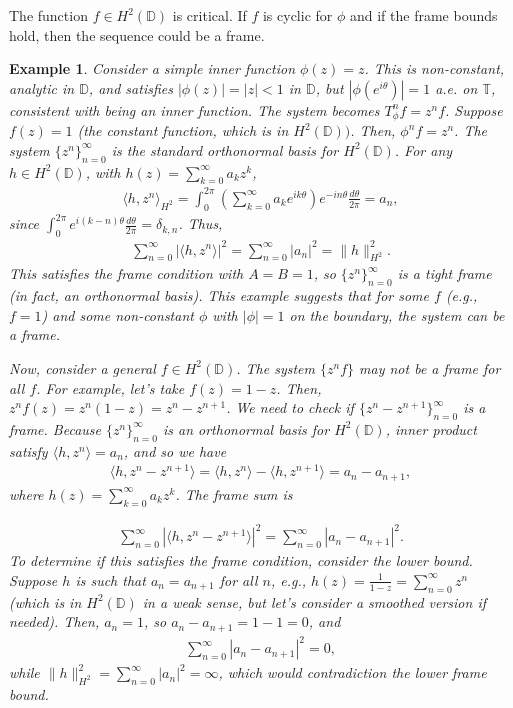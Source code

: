 \documentclass[12pt,titlepage]{amsart}
\newtheorem{exam}[thm]{Example}
\theoremstyle{definition}
\theoremstyle{remark}
\begin{document}
The function $f \in H^2(\mathbb{D})$ is critical. If $f$ is cyclic
for $\phi$ and if the frame bounds hold, then the sequence could
be a frame.
\begin{exam}\label{example.3-1}
Consider a simple inner function $\phi(z)=z$. This is
non-constant, analytic in $\mathbb{D}$, and satisfies
$|\phi(z)|=|z|<1$ in $\mathbb{D}$, but $|\phi(e^{i\theta})|= 1$
a.e. on $\mathbb{T}$, consistent with being an inner function. The
system becomes $T_\phi^n f = z^n f$. Suppose $f(z)=1$ (the
constant function, which is in $H^2(\mathbb{D}))$. Then, $\phi^n
f=z^n$. The system $\{z^n\}_{n=0}^\infty$ is the standard
orthonormal basis for $H^2(\mathbb{D})$. For any $h \in
H^2(\mathbb{D})$, with $h(z) = \sum_{k=0}^\infty a_k z^k$,
\begin{eqnarray*}
\langle h, z^n \rangle_{H^2} = \int_0^{2\pi} \left(
\sum_{k=0}^\infty a_k e^{i k \theta} \right) e^{-i n \theta}
\frac{d\theta}{2\pi} = a_n,
\end{eqnarray*}
 since
$\int_0^{2\pi} e^{i (k-n) \theta} \frac{d\theta}{2\pi} =
\delta_{k,n}$. Thus,
\begin{eqnarray*}
\sum_{n=0}^\infty |\langle h, z^n \rangle|^2 = \sum_{n=0}^\infty
|a_n|^2 = \|h\|_{H^2}^2.
\end{eqnarray*}
This satisfies the frame condition with $A = B = 1$, so
$\{z^n\}_{n=0}^\infty$ is a tight frame (in fact, an orthonormal
basis). This example suggests that for some $f$ (e.g., $f = 1$)
and some non-constant $\phi$ with $|\phi| = 1$ on the boundary,
the system can be a frame.

Now, consider a general $f \in H^2(\mathbb{D})$. The system $\{z^n
f\}$ may not be a frame for all $f$. For example, let's take $f(z)
= 1-z$. Then, $z^n f(z) = z^n (1 - z) = z^n - z^{n+1}$. We need to
check if $\{z^n - z^{n+1}\}_{n=0}^\infty$ is a frame. Because
$\{z^n\}_{n=0}^\infty$ is an orthonormal basis for
$H^2(\mathbb{D})$, inner product satisfy $\langle h, z^n
\rangle=a_n$, and so we have
\begin{eqnarray*}
\langle h, z^n - z^{n+1} \rangle = \langle h, z^n \rangle -
\langle h, z^{n+1} \rangle = a_n - a_{n+1},
\end{eqnarray*}
where $h(z) = \sum_{k=0}^\infty a_k z^k$. The frame sum is

\begin{eqnarray*}
\sum_{n=0}^\infty |\langle h, z^n - z^{n+1} \rangle|^2 =
\sum_{n=0}^\infty |a_n - a_{n+1}|^2.
\end{eqnarray*}
To determine if this satisfies the frame condition, consider the
lower bound. Suppose $h$ is such that $a_n = a_{n+1}$ for all $n$,
e.g., $h(z) = \frac{1}{1-z} = \sum_{n=0}^\infty z^n$ (which is in
$H^2(\mathbb{D})$ in a weak sense, but let's consider a smoothed
version if needed). Then, $a_n = 1$, so $a_n - a_{n+1} = 1 - 1 =
0$, and
\begin{eqnarray*}
\sum_{n=0}^\infty |a_n - a_{n+1}|^2 = 0,
\end{eqnarray*}
while $\|h\|_{H^2}^2 = \sum_{n=0}^\infty |a_n|^2 = \infty$, which
would contradiction the lower frame bound.
\end{exam}
\end{document}
